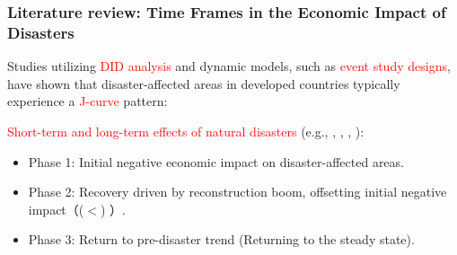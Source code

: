 \documentclass[serif, aspectratio=169]{beamer}
\begin{document}
\begin{frame}[label=literature_review1]
\frametitle{Literature review: Time Frames in the Economic Impact of Disasters}






\vspace{-0.25cm}

Studies utilizing \textcolor{red}{DID analysis} and dynamic models, such as \textcolor{red}{event study designs}, have shown that disaster-affected areas in developed countries typically experience a \textcolor{red}{J-curve} pattern:


    \begin{minipage}[c]{0.4\linewidth}
        \small

        \vspace{-3.1cm}
        
\textcolor{red}{Short-term and long-term effects of natural disasters} (e.g., \citet{Deryugina2018TheReturns}, \citet{Canessa2021WomensShocks}, \citet{Kahraman2023AEarthquake}, \citet{Porcelli2019TheItaly}): 
\begin{itemize}
    \item Phase 1: Initial negative economic impact on disaster-affected areas.
    \item Phase 2: Recovery driven by reconstruction boom, offsetting initial negative impact（($<$) ）.
    \item Phase 3: Return to pre-disaster trend (Returning to the steady state).
\end{itemize}


\end{minipage}
\end{frame}
\end{document}
